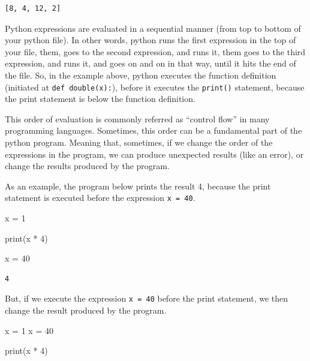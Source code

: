 \documentclass[
  11pt,
  letterpaper,
  DIV=11,
  numbers=noendperiod]{scrreprt}
\newenvironment{Shaded}{\begin{snugshade}}{\end{snugshade}}
\newcommand{\BuiltInTok}[1]{\textcolor[rgb]{0.00,0.23,0.31}{#1}}
\newcommand{\DecValTok}[1]{\textcolor[rgb]{0.68,0.00,0.00}{#1}}
\newcommand{\NormalTok}[1]{\textcolor[rgb]{0.00,0.23,0.31}{#1}}
\newcommand{\OperatorTok}[1]{\textcolor[rgb]{0.37,0.37,0.37}{#1}}
\begin{document}
\begin{verbatim}
[8, 4, 12, 2]
\end{verbatim}

Python expressions are evaluated in a sequential manner (from top to
bottom of your python file). In other words, python runs the first
expression in the top of your file, them, goes to the second expression,
and runs it, them goes to the third expression, and runs it, and goes on
and on in that way, until it hits the end of the file. So, in the
example above, python executes the function definition (initiated at
\texttt{def\ double(x):}), before it executes the \texttt{print()}
statement, because the print statement is below the function definition.

This order of evaluation is commonly referred as ``control flow'' in
many programming languages. Sometimes, this order can be a fundamental
part of the python program. Meaning that, sometimes, if we change the
order of the expressions in the program, we can produce unexpected
results (like an error), or change the results produced by the program.

As an example, the program below prints the result 4, because the print
statement is executed before the expression \texttt{x\ =\ 40}.

\begin{Shaded}
\begin{Highlighting}[]
\NormalTok{x }\OperatorTok{=} \DecValTok{1}

\BuiltInTok{print}\NormalTok{(x }\OperatorTok{*} \DecValTok{4}\NormalTok{)}

\NormalTok{x }\OperatorTok{=} \DecValTok{40}
\end{Highlighting}
\end{Shaded}

\begin{verbatim}
4
\end{verbatim}

But, if we execute the expression \texttt{x\ =\ 40} before the print
statement, we then change the result produced by the program.

\begin{Shaded}
\begin{Highlighting}[]
\NormalTok{x }\OperatorTok{=} \DecValTok{1}
\NormalTok{x }\OperatorTok{=} \DecValTok{40}

\BuiltInTok{print}\NormalTok{(x }\OperatorTok{*} \DecValTok{4}\NormalTok{)}
\end{Highlighting}
\end{Shaded}
\end{document}
